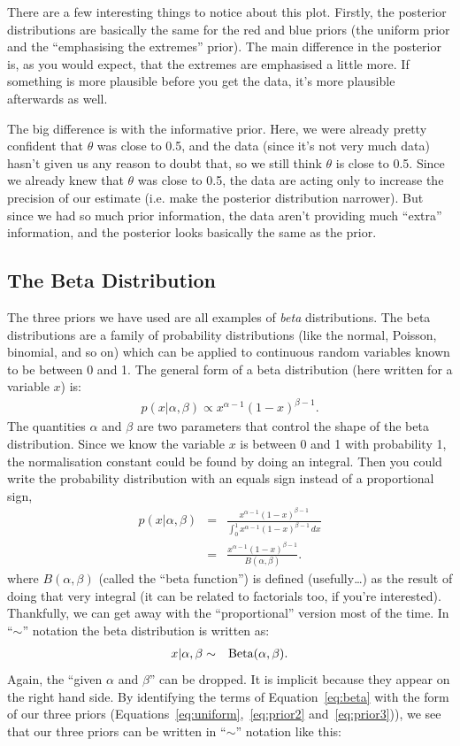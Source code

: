 There are a few interesting things to notice about this plot. Firstly, the
posterior distributions are basically the same for the red and blue priors (the
uniform prior and the ``emphasising the extremes'' prior). The main difference in the
posterior is, as you would expect, that the extremes are emphasised a little
more. If something is more plausible before you get the data, it's more
plausible afterwards as well.

The big difference is with the informative prior. Here, we were already pretty
confident that $\theta$ was close to 0.5, and the data (since it's not very
much data) hasn't given us any reason to doubt that, so we still think $\theta$
is close to 0.5. Since we already knew that $\theta$ was close to 0.5, the data
are acting only to increase the precision of our estimate (i.e. make the
posterior distribution narrower). But since we had so much prior information,
the data aren't providing much ``extra'' information, and the posterior looks
basically the same as the prior.

\subsection{The Beta Distribution}
The three priors we have used are all examples of {\it beta} distributions. The beta
distributions are a family of probability distributions (like the normal, Poisson,
binomial, and so on) which can be applied to continuous random variables known
to be between 0 and 1. The general form of a beta distribution (here written
for a variable $x$) is:
\begin{eqnarray}
p(x|\alpha, \beta) \propto x^{\alpha - 1}(1 - x)^{\beta - 1}\label{eq:beta}.
\end{eqnarray}
The quantities $\alpha$ and $\beta$ are two parameters that control the shape
of the beta distribution. Since we know the variable $x$ is between 0 and 1 with probability 1, the
normalisation constant could be found by doing an integral. Then you could write
the probability distribution with an equals sign instead of a proportional sign,
\begin{eqnarray}
p(x|\alpha, \beta) &=& \frac{x^{\alpha - 1}(1 - x)^{\beta - 1}}
{\int_0^1 x^{\alpha - 1}(1 - x)^{\beta - 1} \, dx}\\
&=& \frac{x^{\alpha - 1}(1 - x)^{\beta - 1}}
{B(\alpha, \beta)}.
\end{eqnarray}
where $B(\alpha, \beta)$ (called the ``beta function'') is defined (usefully\ldots) as the
result of doing that very integral (it can be related to factorials too, if you're interested).
Thankfully, we can get away with the ``proportional'' version most of the time.
In ``$\sim$'' notation the beta distribution is written as:
\begin{eqnarray}
x|\alpha, \beta &\sim& \textnormal{Beta}(\alpha, \beta).
\end{eqnarray}
Again, the ``given $\alpha$ and $\beta$'' can be dropped. It is implicit because
they appear on the right hand side. By identifying the terms of
Equation~\ref{eq:beta} with the form of our three priors (Equations~\ref{eq:uniform},~\ref{eq:prior2} and~\ref{eq:prior3})),
we see that our three priors can be written in ``$\sim$'' notation like this:

